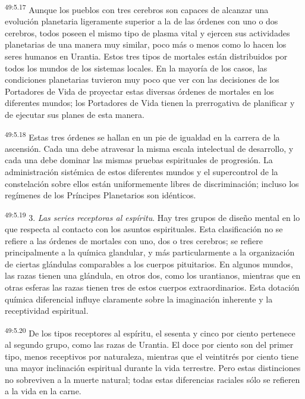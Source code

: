 \par
\textsuperscript{49:5.17} Aunque los pueblos con tres cerebros son capaces de alcanzar una evolución planetaria ligeramente superior a la de las órdenes con uno o dos cerebros, todos poseen el mismo tipo de plasma vital y ejercen sus actividades planetarias de una manera muy similar, poco más o menos como lo hacen los seres humanos en Urantia. Estos tres tipos de mortales están distribuidos por todos los mundos de los sistemas locales. En la mayoría de los casos, las condiciones planetarias tuvieron muy poco que ver con las decisiones de los Portadores de Vida de proyectar estas diversas órdenes de mortales en los diferentes mundos; los Portadores de Vida tienen la prerrogativa de planificar y de ejecutar sus planes de esta manera.

\par
\textsuperscript{49:5.18} Estas tres órdenes se hallan en un pie de igualdad en la carrera de la ascensión. Cada una debe atravesar la misma escala intelectual de desarrollo, y cada una debe dominar las mismas pruebas espirituales de progresión. La administración sistémica de estos diferentes mundos y el supercontrol de la constelación sobre ellos están uniformemente libres de discriminación; incluso los regímenes de los Príncipes Planetarios son idénticos.

\par
\textsuperscript{49:5.19} 3. \textit{Las series receptoras al espíritu}. Hay tres grupos de diseño mental en lo que respecta al contacto con los asuntos espirituales. Esta clasificación no se refiere a las órdenes de mortales con uno, dos o tres cerebros; se refiere principalmente a la química glandular, y más particularmente a la organización de ciertas glándulas comparables a los cuerpos pituitarios. En algunos mundos, las razas tienen una glándula, en otros dos, como los urantianos, mientras que en otras esferas las razas tienen tres de estos cuerpos extraordinarios. Esta dotación química diferencial influye claramente sobre la imaginación inherente y la receptividad espiritual.

\par
\textsuperscript{49:5.20} De los tipos receptores al espíritu, el sesenta y cinco por ciento pertenece al segundo grupo, como las razas de Urantia. El doce por ciento son del primer tipo, menos receptivos por naturaleza, mientras que el veintitrés por ciento tiene una mayor inclinación espiritual durante la vida terrestre. Pero estas distinciones no sobreviven a la muerte natural; todas estas diferencias raciales sólo se refieren a la vida en la carne.

